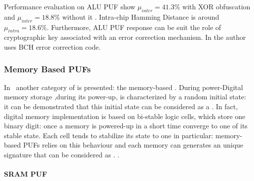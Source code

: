 \documentclass[../tesi.tex]{subfiles}
\begin{document}
Performance evaluation on ALU PUF show $\mu_{inter} = 41.3\%$ with XOR obfuscation and $\mu_{inter} = 18.8\%$ without it . Intra-chip Hamming Distance is around $\mu_{intra} = 18.6\%$. 
Furthermore, ALU PUF response can be suit the role of cryptographic key associated with an error correction mechanism. In \cite{kong2014pufatt} the author uses BCH error correction code. 
\subsubsection{Memory Based PUFs}
In~\cite{su2007isscc} another category of \puf{} is presented: the memory-based . During power-Digital memory storage ,during its power-up, is characterized by a random initial state: it can be demonstrated that this initial state can be considered as a \puf{}. In fact, digital memory implementation is based on bi-stable logic cells, which store one binary digit: once a memory is powered-up in a short time converge to one of its stable state. Each cell tends to stabilize its state to one in particular: memory-based PUFs relies on this behaviour and each memory can generates an unique signature that can be considered as \puf{}. . 
\paragraph{SRAM PUF} \label{par:srampuf}
\end{document}
